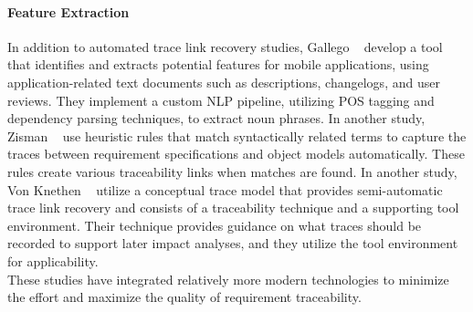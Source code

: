 \paragraph{Feature Extraction}
In addition to automated trace link recovery studies, Gallego \etal{}~\cite{Marf2023TransFeatExAN} develop a tool that identifies and extracts potential features for mobile applications, using application-related text documents such as descriptions, changelogs, and user reviews. They implement a custom NLP pipeline, utilizing POS tagging and dependency parsing techniques, to extract noun phrases. In another study, Zisman \etal{}~\cite{zisman-2003} use heuristic rules that match syntactically related terms to capture the traces between requirement specifications and object models automatically. These rules create various traceability links when matches are found. In another study, Von Knethen \etal{}~\cite{knethen-2003} utilize a conceptual trace model that provides semi-automatic trace link recovery and consists of a traceability technique and a supporting tool environment. Their technique provides guidance on what traces should be recorded to support
later impact analyses, and they utilize the tool environment for applicability.\\

These studies have integrated relatively more modern technologies to minimize the effort and maximize the quality of requirement traceability.

